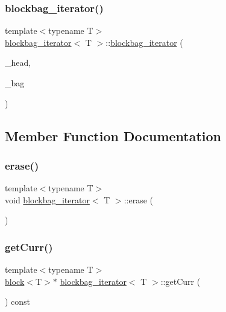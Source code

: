 \subsubsection{\texorpdfstring{blockbag\+\_\+iterator()}{blockbag\_iterator()}}
{\footnotesize\ttfamily template$<$typename T$>$ \\
\hyperlink{classblockbag__iterator}{blockbag\+\_\+iterator}$<$ T $>$\+::\hyperlink{classblockbag__iterator}{blockbag\+\_\+iterator} (\begin{DoxyParamCaption}\item[{\hyperlink{classblock}{block}$<$ T $>$ $\ast$const}]{\+\_\+head,  }\item[{\hyperlink{classblockbag}{blockbag}$<$ T $>$ $\ast$const}]{\+\_\+bag }\end{DoxyParamCaption})\hspace{0.3cm}{\ttfamily [inline]}}



\subsection{Member Function Documentation}
\mbox{\label{classblockbag__iterator_ab23a01d4163d17774780893a01a76ae5}} 
\subsubsection{\texorpdfstring{erase()}{erase()}}
{\footnotesize\ttfamily template$<$typename T$>$ \\
void \hyperlink{classblockbag__iterator}{blockbag\+\_\+iterator}$<$ T $>$\+::erase (\begin{DoxyParamCaption}{ }\end{DoxyParamCaption})\hspace{0.3cm}{\ttfamily [inline]}}

\mbox{\label{classblockbag__iterator_aa99d991d209d80cbdb27309d6cfb8efa}} 
\subsubsection{\texorpdfstring{get\+Curr()}{getCurr()}}
{\footnotesize\ttfamily template$<$typename T$>$ \\
\hyperlink{classblock}{block}$<$T$>$$\ast$ \hyperlink{classblockbag__iterator}{blockbag\+\_\+iterator}$<$ T $>$\+::get\+Curr (\begin{DoxyParamCaption}{ }\end{DoxyParamCaption}) const\hspace{0.3cm}{\ttfamily [inline]}}

